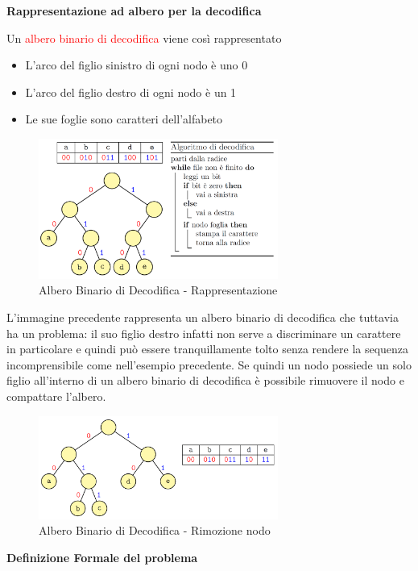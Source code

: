 \documentclass[../cheatSheetAlgoritmi.tex]{subfiles}
\begin{document}
\newpage
\begin{flushleft}
\textbf{Rappresentazione ad albero per la decodifica}
\end{flushleft}
Un \textcolor{red}{albero binario di decodifica} viene così rappresentato
\begin{itemize}
	\item L'arco del figlio sinistro di ogni nodo è uno 0
	\item L'arco del figlio destro di ogni nodo è un 1
	\item Le sue foglie sono caratteri dell'alfabeto
\end{itemize}
\begin{figure}[h]
	\centering
	\includegraphics[width=0.7\textwidth]{../img/Greedy_2.png}
	\caption{Albero Binario di Decodifica - Rappresentazione}
\end{figure}
L'immagine precedente rappresenta un albero binario di decodifica che tuttavia ha un problema: il suo figlio destro infatti non serve a discriminare un carattere in particolare e quindi può essere tranquillamente tolto senza rendere la sequenza incomprensibile come nell'esempio precedente. Se quindi un nodo possiede un solo figlio all'interno di un albero binario di decodifica è possibile rimuovere il nodo e compattare l'albero.\\
\begin{figure}[h]
\centering
\includegraphics[width=0.7\textwidth]{../img/Greedy_3.png}
\caption{Albero Binario di Decodifica - Rimozione nodo}
\end{figure}
\newpage
\begin{flushleft}
\textbf{Definizione Formale del problema}
\end{flushleft}
\end{document}
